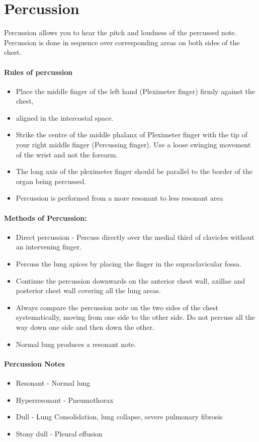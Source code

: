 \documentclass[a4paper,12pt,openany,oneside]{book}
\begin{document}
\section*{Percussion}
Percussion  allows  you  to  hear  the  pitch  and  loudness  of  the  percussed  note.  Percussion is done in sequence over corresponding areas on both sides of the chest.

\paragraph{Rules of percussion}
\begin{itemize}
\item{Place the middle finger of the left hand (Pleximeter finger) firmly against the chest,}
\item{aligned in the intercostal space.}
\item{Strike the centre of the middle phalanx of Pleximeter finger with the tip of your right middle finger (Percussing finger). Use a loose swinging movement of the wrist and not the forearm.}
\item{The long axis of the pleximeter finger should be parallel to the border of the organ being percussed.}
\item{Percussion is performed from a more resonant to less resonant area}
\end{itemize}

\paragraph{Methods of Percussion:}
\begin{itemize}
\item{Direct  percussion  -  Percuss  directly  over  the  medial  third  of  clavicles  without  an intervening finger.}
\item{Percuss the lung apices by placing the finger in the supraclavicular fossa.}
\item{Continue the percussion downwards on the anterior chest wall, axillae and posterior chest wall covering all the lung areas.}
\item{Always  compare  the  percussion  note  on  the  two  sides  of  the  chest systematically, moving from one side to the other side. Do not percuss all the way down one side and then down the other.}
\item{Normal lung produces a resonant note.}
\end{itemize}

\paragraph{Percussion Notes}
\begin{itemize}
\item{Resonant 		- 	Normal lung}
\item{Hyperresonant 	-	Pneumothorax}
\item{Dull 			-	Lung Consolidation, lung collapse, severe pulmonary 					fibrosis }
\item{Stony dull 		-	Pleural effusion}
\end{itemize}
\end{document}
